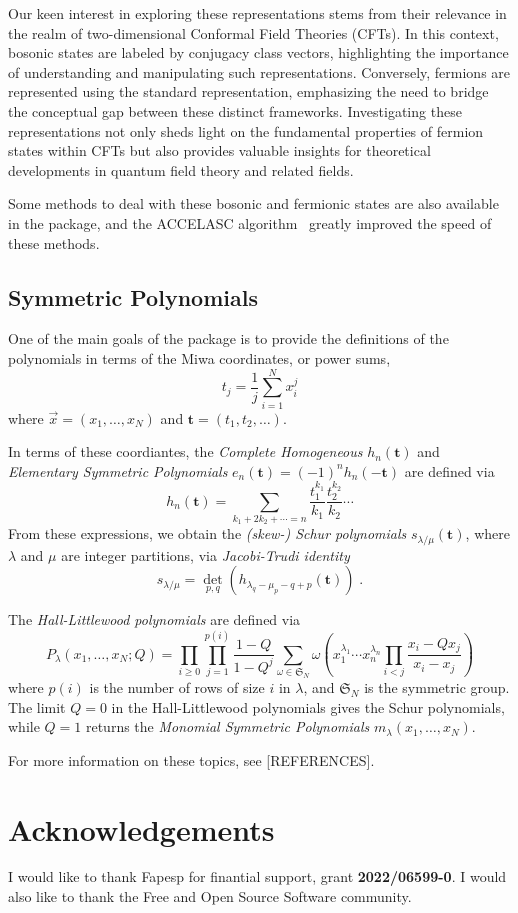 \documentclass[a4paper,10pt]{amsart}
\begin{document}
Our keen interest in exploring these representations stems
from their relevance in the realm of two-dimensional Conformal Field
Theories (CFTs). In this context, bosonic states are labeled by
conjugacy class vectors, highlighting the importance of
understanding and manipulating such representations. Conversely,
fermions are represented using the standard representation,
emphasizing the need to bridge the conceptual gap between these
distinct frameworks. Investigating these representations not only
sheds light on the fundamental properties of fermion states within
CFTs but also provides valuable insights for theoretical developments
in quantum field theory and related fields.

Some methods to deal with these bosonic and fermionic states are
also available in the package, and the \textrm{ACCELASC}
algorithm~\cite{Kelleher:2009} greatly improved the
speed of these methods.


\subsection{Symmetric Polynomials}

One of the main goals of the package is to provide the definitions of the 
polynomials in terms of the Miwa coordinates, or power sums, 
$$ t_j = \frac{1}{j} \sum_{i=1}^N x_i^j $$ where $\vec{x} = 
(x_1, \dots, x_N)$ and $\mathbf{t} = (t_1, t_2, \dots)$.

In terms of these coordiantes, the \emph{Complete Homogeneous} $h_n(\mathbf{t})$ 
and \emph{Elementary Symmetric Polynomials} $e_n(\mathbf{t}) = 
(-1)^n h_n(-\mathbf{t})$ are defined via 
$$ h_n(\mathbf{t}) = \sum_{k_1 + 2k_2+ \cdots = n} 
\frac{t_1^{k_1}}{k_1}\frac{t_2^{k_2}}{k_2} \cdots $$
From these expressions, we obtain the \emph{(skew-) Schur polynomials}
$s_{\lambda/\mu}(\mathbf{t})$, where 
$\lambda$ and $\mu$ are integer partitions, via \emph{Jacobi-Trudi identity}
$$ s_{\lambda/\mu} = \det_{p,q}(h_{\lambda_q - \mu_p - q + p}(\mathbf{t})) \; . $$

The \emph{Hall-Littlewood polynomials} are defined via
$$P_{\lambda}(x_1, \dots, x_N; Q) =
    \prod_{i\geq 0} \prod_{j=1}^{p(i)} \frac{1-Q}{1-Q^j}
    \sum_{\omega \in \mathfrak{S}_N} \omega\left( x_1^{\lambda_1}\cdots x_n^{\lambda_n}
    \prod_{i<j} \frac{x_i - Q x_j}{x_i - x_j} \right)$$
where $p(i)$ is the number of rows of size $i$ in $\lambda$, and $\mathfrak{S}_N$ is the 
symmetric group. The limit $Q=0$ in the Hall-Littlewood polynomials gives the Schur 
polynomials, while $Q=1$ returns the \emph{Monomial Symmetric Polynomials}
$m_\lambda(x_1, \dots, x_N)$.
        
For more information on these topics, see [REFERENCES].

\section{Acknowledgements}

I would like to thank Fapesp for finantial support, grant
\textbf{2022/06599-0}.  I would also like to thank the Free and Open
Source Software community.

\printbibliography
     
\end{document}
